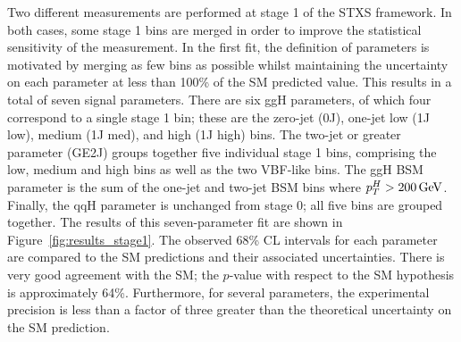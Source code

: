 Two different measurements are performed at stage 1 of the STXS framework.
In both cases, some stage 1 bins are merged 
in order to improve the statistical sensitivity of the measurement.
In the first fit, the definition of parameters is motivated by merging as few bins as possible
whilst maintaining the uncertainty on each parameter at less than 100\% of the SM predicted value.
This results in a total of seven signal parameters.
There are six ggH parameters, of which four correspond to a single stage 1 bin;
these are the zero-jet (0J), one-jet low (1J low), medium (1J med), and high (1J high) \ptH bins.
The two-jet or greater parameter (GE2J) groups together five individual stage 1 bins, 
comprising the low, medium and high \ptH bins as well as the two VBF-like bins.
The ggH BSM parameter is the sum of the one-jet and two-jet BSM bins
where $p_T^H > \SI{200}{GeV}$.
Finally, the qqH parameter is unchanged from stage 0;
all five bins are grouped together.
The results of this seven-parameter fit are shown in Figure~\ref{fig:results_stage1}. 
The observed 68\% CL intervals for each parameter are compared 
to the SM predictions and their associated uncertainties.
There is very good agreement with the SM; 
the $p$-value with respect to the SM hypothesis is approximately 64\%. %
Furthermore, for several parameters, the experimental precision is less than a factor of three 
greater than the theoretical uncertainty on the SM prediction. %

